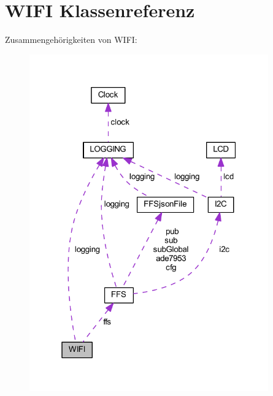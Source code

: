 \hypertarget{class_w_i_f_i}{}\section{W\+I\+FI Klassenreferenz}
\label{class_w_i_f_i}


Zusammengehörigkeiten von W\+I\+FI\+:\nopagebreak
\begin{figure}[H]
\begin{center}
\leavevmode
\includegraphics[width=292pt]{class_w_i_f_i__coll__graph}
\end{center}
\end{figure}
